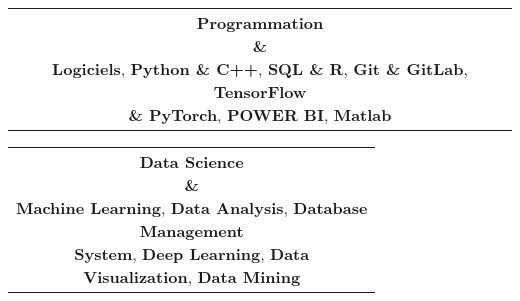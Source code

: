 \documentclass[theme]{cv_einstein}
\begin{document}
    \setlength{\columnsep}{0px}
    \columnratio{\lratio}
    \begin{paracol}{2}
        \paracolbackgroundoptions

        
        \begin{leftcolumn}
        
        {\color{white}    
        \noindent \footnotesize
           \footnotesize\color{white}
            \begin{minipage}[c]{\leftcolwidth}
                \begin{tabular}{c}
                    \bubblediagram{
                        {\textbf{\;\;Programmation} \\ \textbf{\&}\\
                        \textbf{Logiciels}},
                        \textbf{Python \& C++},
                        \textbf{SQL \& R},
                        \textbf{Git \& GitLab},
                        \textbf{TensorFlow}\\ \textbf{\& PyTorch},
                        \textbf{POWER BI},
                        \textbf{\;Matlab\;}
                       } 
                \end{tabular}
            \end{minipage}
\begin{minipage}[c]{\leftcolwidth}
                \begin{tabular}{c}
                    \bubblediagram{
                        {\textbf{Data Science} \\ \textbf{\&}\\
                        \textbf{Machine Learning}},
                        \textbf{Data Analysis},
                        \textbf{Database} \\  \textbf{Management} \\  \textbf{System},
                        \textbf{Deep Learning},
                        \textbf{Data} \\ \textbf{Visualization},
                        \textbf{Data Mining}
                       } 
                \end{tabular}
            \end{minipage}

}
\end{leftcolumn}
\end{paracol}
\end{document}
